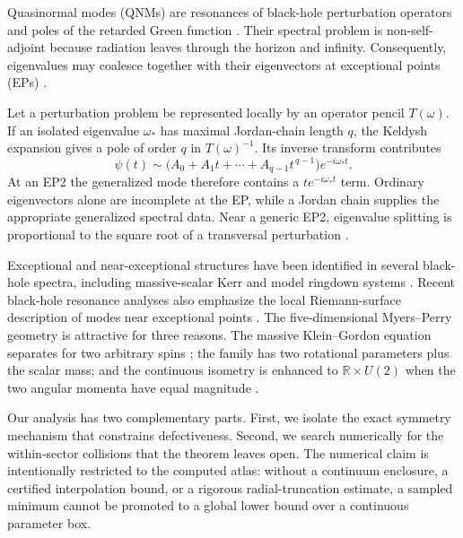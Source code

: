 \documentclass[10pt]{article}
\theoremstyle{plain}
\begin{document}
Quasinormal modes (QNMs) are resonances of black-hole perturbation operators
and poles of the retarded Green function
\citep{kokkotas1999,berti2009,konoplya2011,berti2026}. Their spectral problem
is non-self-adjoint because radiation leaves through the horizon and infinity.
Consequently, eigenvalues may coalesce together with their eigenvectors at
exceptional points (EPs) \citep{kato1995,bergholtz2021,ashida2020}.

Let a perturbation problem be represented locally by an operator pencil
$T(\omega)$. If an isolated eigenvalue $\omega_*$ has maximal Jordan-chain
length $q$, the Keldysh expansion gives a pole of order $q$ in
$T(\omega)^{-1}$. Its inverse transform contributes
\begin{equation}
\psi(t)\sim\bigl(A_0+A_1t+\cdots+A_{q-1}t^{\,q-1}\bigr)e^{-i\omega_*t}.
\label{eq:keldysh}
\end{equation}
At an EP2 the generalized mode therefore contains a $te^{-i\omega_*t}$ term.
Ordinary eigenvectors alone are incomplete at the EP, while a Jordan chain
supplies the appropriate generalized spectral data. Near a generic EP2,
eigenvalue splitting is proportional to the square root of a transversal
perturbation \citep{kato1995,macedo2026}.

Exceptional and near-exceptional structures have been identified in several
black-hole spectra, including massive-scalar Kerr and model ringdown systems
\citep{cavalcante2024,cavalcante2026,motohashi2025,macedo2026,cao2025}. Recent
black-hole resonance analyses also emphasize the local Riemann-surface
description of modes near exceptional points \citep{yang2025}. The
five-dimensional Myers--Perry geometry is attractive for three reasons. The
massive Klein--Gordon equation separates for two arbitrary spins
\citep{frolov2003,murata2008,huang2025}; the family has two rotational
parameters plus the scalar mass; and the continuous isometry is enhanced to
$\mathbb{R}\times U(2)$ when the two angular momenta have equal magnitude
\citep{myers1986,myers2012}.

Our analysis has two complementary parts. First, we isolate the exact symmetry
mechanism that constrains defectiveness. Second, we search numerically for the
within-sector collisions that the theorem leaves open. The numerical claim is
intentionally restricted to the computed atlas: without a continuum enclosure,
a certified interpolation bound, or a rigorous radial-truncation estimate, a
sampled minimum cannot be promoted to a global lower bound over a continuous
parameter box.
\end{document}
